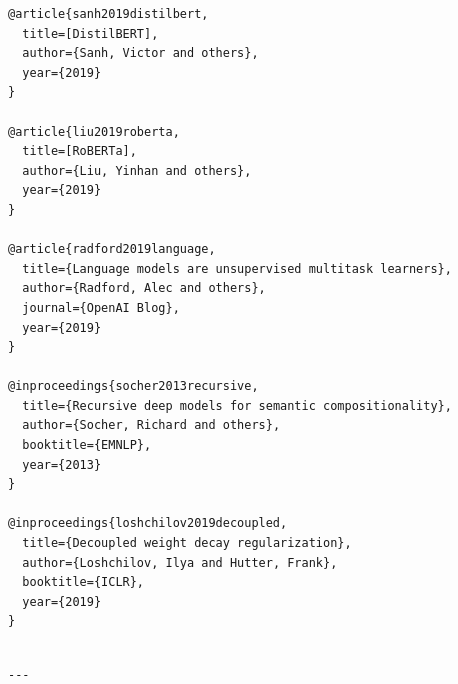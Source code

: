 \begin{lstlisting}
@article{sanh2019distilbert,
  title=[DistilBERT],
  author={Sanh, Victor and others},
  year={2019}
}

@article{liu2019roberta,
  title=[RoBERTa],
  author={Liu, Yinhan and others},
  year={2019}
}

@article{radford2019language,
  title={Language models are unsupervised multitask learners},
  author={Radford, Alec and others},
  journal={OpenAI Blog},
  year={2019}
}

@inproceedings{socher2013recursive,
  title={Recursive deep models for semantic compositionality},
  author={Socher, Richard and others},
  booktitle={EMNLP},
  year={2013}
}

@inproceedings{loshchilov2019decoupled,
  title={Decoupled weight decay regularization},
  author={Loshchilov, Ilya and Hutter, Frank},
  booktitle={ICLR},
  year={2019}
}
\end{lstlisting}
\begin{lstlisting}

---
\end{lstlisting}